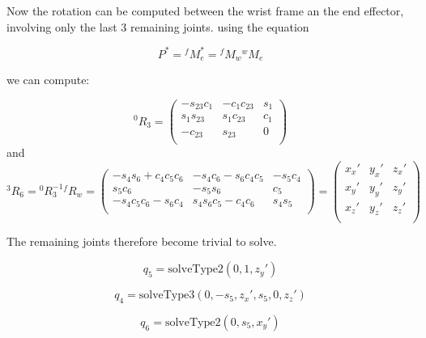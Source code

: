\documentclass[11pt, oneside]{article}   	%
\begin{document}
Now the rotation can be computed between the wrist frame an the end effector, involving only the last 3 remaining joints. using the equation

\begin{equation*}
P^* = {}^fM_e^* = {}^fM_w{}^wM_e
\end{equation*}

we can compute:

\begin{equation*}
^{0}R_3 = 
\begin{pmatrix}
-s_{23} c_1 & -c_1 c_{23} & s_1 \\
s_1 s_{23} & s_1 c_{23} & c_1 \\
-c_{23} & s_{23} & 0 \\
\end{pmatrix}
\end{equation*}
and
\begin{equation*}
{}^3R_6 = {}^0R_3^{-1}{}^fR_w = 
\begin{pmatrix}
-s_4s_6+c_4c_5c_6 & -s_4c_6-s_6c_4c_5 & -s_5c_4\\
s_5c_6 & -s_5s_6 & c_5\\
-s_4c_5c_6-s_6c_4 & s_4s_6c_5 - c_4c_6 & s_4s_5\\
\end{pmatrix}
=
\begin{pmatrix}
x_x' & y_x' & z_x'\\
x_y' & y_y' & z_y'\\
x_z' & y_z' & z_z'\\
\end{pmatrix}
\end{equation*}

The remaining joints therefore become trivial to solve.

\begin{equation}
q_5 = \text{solveType2}(0,1,z_y')
\end{equation}

\begin{equation}
q_4 = \text{solveType3}(0,-s_5,z_x',s_5,0,z_z')
\end{equation}

\begin{equation}
q_6 = \text{solveType2}(0,s_5,x_y')
\end{equation}
\end{document}
